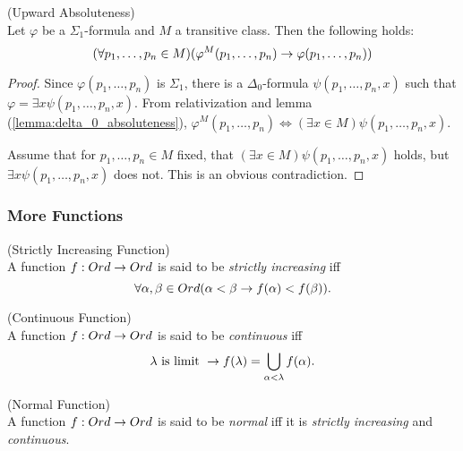 \begin{lemma}{(Upward Absoluteness)}\label{lemma:upward_absoluteness}\\
Let $\varphi$ be a $\Sigma_1$-formula and $M$ a transitive class. Then the following holds:
\begin{equation}
(\forall p_1, \ldots, p_n \in M)(\varphi^M(p_1, \ldots, p_n) \rightarrow \varphi(p_1, \ldots, p_n))
\end{equation}
\end{lemma}
\begin{proof}
Since $\varphi(p_1, \ldots, p_n)$ is $\Sigma_1$, there is a $\Delta_0$-formula $\psi(p_1, \ldots, p_n, x)$ such that $\varphi = \exists x \psi(p_1, \ldots, p_n, x)$. 
From relativization and lemma (\ref{lemma:delta_0_absoluteness}), $\varphi^M(p_1, \ldots, p_n) \iff (\exists x \in M)\psi(p_1, \ldots, p_n, x)$.

Assume that for $p_1, \ldots, p_n \in M$ fixed, that $(\exists x \in M)\psi(p_1, \ldots, p_n, x)$ holds, but $\exists x \psi(p_1, \ldots, p_n, x)$ does not. This is an obvious contradiction.
\end{proof}


\subsubsection{More Functions}

\begin{definition}{(Strictly Increasing Function)}\label{def:increasing_function}\\
A function $f: Ord \rightarrow Ord$ is said to be \emph{strictly increasing} iff
\begin{equation}
\forall \alpha, \beta \in Ord (\alpha < \beta \rightarrow f(\alpha) < f(\beta)).
\end{equation}
\end{definition}

\begin{definition}{(Continuous Function)}\label{def:continuous_function}\\
A function $f: Ord \rightarrow Ord$ is said to be \emph{continuous} iff
\begin{equation}
\lambda\mbox{ is limit } \rightarrow f(\lambda) = \bigcup_{\alpha < \lambda} f(\alpha).
\end{equation}
\end{definition}

\begin{definition}{(Normal Function)}\label{def:normal_function}\\
A function $f: Ord \rightarrow Ord$ is said to be \emph{normal} iff it is \emph{strictly increasing} and \emph{continuous}.
\end{definition}

